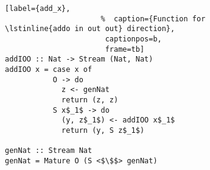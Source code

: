 \begin{figure}[!t]
  \centering
  \begin{minipage}{\columnwidth}
    \begin{lstlisting}[label={add_x},
                      %  caption={Function for \lstinline{addo in out out} direction},
                       captionpos=b,
                       frame=tb]
addIOO :: Nat -> Stream (Nat, Nat)
addIOO x = case x of
           O -> do
             z <- genNat
             return (z, z)
           S x$_1$ -> do
             (y, z$_1$) <- addIOO x$_1$
             return (y, S z$_1$)

genNat :: Stream Nat
genNat = Mature O (S <$\$$> genNat)
    \end{lstlisting}
  \end{minipage}
\end{figure}